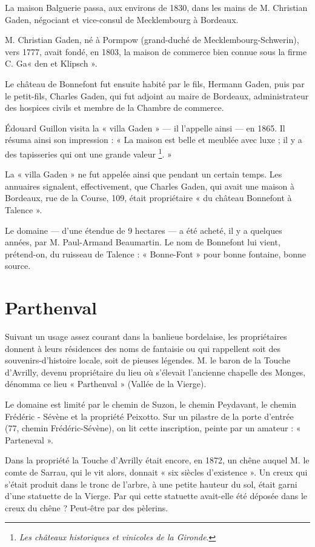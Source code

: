 La maison Balguerie passa, aux environs de 1830, dans les mains de M. Christian Gaden, négociant et vice-consul de Mecklembourg à Bordeaux.

M. Christian Gaden, né à Pormpow (grand-duché de Mecklembourg-Schwerin), vers 1777, avait fondé, en 1803, la maison de commerce bien connue sous la firme C. Ga« den et Klipsch ».

Le château de Bonnefont fut ensuite habité par le fils, Hermann Gaden, puis par le petit-fils, Charles Gaden, qui fut adjoint au maire de Bordeaux, administrateur des hospices civils et membre de la Chambre de commerce.

Édouard Guillon visita la « villa Gaden » — il l'appelle ainsi — en 1865. Il résuma ainsi son impression : « La maison est belle et meublée avec luxe ; il y a des tapisseries qui ont une grande valeur \footnote{\textit{Les châteaux historiques et vinicoles de la Gironde}.}. »

La « villa Gaden » ne fut appelée ainsi que pendant un certain temps. Les annuaires signalent, effectivement, que Charles Gaden, qui avait une maison à Bordeaux, rue de la Course, 109, était propriétaire « du château Bonnefont à Talence ».

Le domaine — d'une étendue de 9 hectares — a été acheté, il y a quelques années, par M. Paul-Armand Beaumartin. Le nom de Bonnefont lui vient, prétend-on, du ruisseau de Talence : « Bonne-Font » pour bonne fontaine, bonne source.

\section{Parthenval}

Suivant un usage assez courant dans la banlieue bordelaise, les propriétaires donnent à leurs résidences des noms de fantaisie ou qui rappellent soit des souvenirs-d'histoire locale, soit de pieuses légendes. M. le baron de la Touche d'Avrilly, devenu propriétaire du lieu où s'élevait l'ancienne chapelle des Monges, dénomma ce lieu « Parthenval » (Vallée de la Vierge).

Le domaine est limité par le chemin de Suzon, le chemin Peydavant, le chemin Frédéric - Sévène et la propriété Peixotto. Sur un pilastre de la porte d'entrée (77, chemin Frédéric-Sévène), on lit cette inscription, peinte par un amateur : « Parteneval ».

Dans la propriété la Touche d'Avrilly était encore, en 1872, un chêne auquel M. le comte de Sarrau, qui le vit alors, donnait « six siècles d'existence ». Un creux qui s'était produit dans le tronc de l'arbre, à une petite hauteur du sol, était garni d'une statuette de la Vierge. Par qui cette statuette avait-elle été déposée dans le creux du chêne ? Peut-être par des pèlerins.

